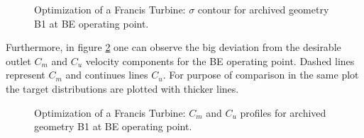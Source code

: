 \begin{figure}[h!]
\begin{minipage}[b]{1\linewidth}
 \centering
\end{minipage}
\caption{Optimization of a Francis Turbine: $\sigma$ contour for archived geometry B1 at BE operating point.}
\label{Francis-B1-BE}
\end{figure}

Furthermore, in figure \ref{Francis-B1-OUT} one can observe the big deviation from the desirable outlet $C_m$ and $C_u$ velocity components for the BE operating point.  Dashed lines represent $C_m$ and continues lines $C_u$. For purpose of comparison in the same plot the target distributions are plotted with thicker lines.   

\begin{figure}[h!]
\begin{minipage}[b]{1\linewidth}
 \centering
\end{minipage}
\caption{Optimization of a Francis Turbine: $C_m$ and $C_u$ profiles for archived geometry B1 at BE operating point.}
\label{Francis-B1-OUT}
\end{figure}

